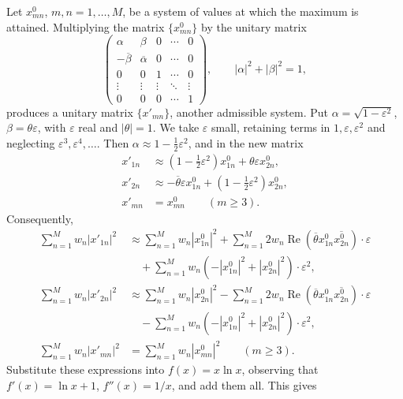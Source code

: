 \documentclass[fontsize=13pt,twoside,openany,headings=normal,parskip=false,bookmarkpackage=false,DIV=calc]{scrbook}
\begin{document}
Let $x^0_{mn}$, $m,n=1,\ldots,M$, be a system of values at which the maximum is attained. Multiplying the matrix $\{x^0_{mn}\}$ by the unitary matrix
\[
\begin{pmatrix}
\alpha&\beta&0&\cdots&0\\
-\overline\beta&\overline\alpha&0&\cdots&0\\
0&0&1&\cdots&0\\
\vdots&\vdots&\vdots&\ddots&\vdots\\
0&0&0&\cdots&1
\end{pmatrix},\qquad |\alpha|^2+|\beta|^2=1,
\]
produces a unitary matrix $\{x'_{mn}\}$, another admissible system. Put $\alpha=\sqrt{1-\varepsilon^2}$, $\beta=\theta\varepsilon$, with $\varepsilon$ real and $|\theta|=1$. We take $\varepsilon$ small, retaining terms in $1,\varepsilon,\varepsilon^2$ and neglecting $\varepsilon^3,\varepsilon^4,\ldots$. Then $\alpha\approx1-\tfrac12\varepsilon^2$, and in the new matrix
\begin{align*}
 x'_{1n}&\approx(1-\tfrac12\varepsilon^2)x^0_{1n}+\theta\varepsilon x^0_{2n},\\
 x'_{2n}&\approx-\overline\theta\varepsilon x^0_{1n}+(1-\tfrac12\varepsilon^2)x^0_{2n},\\
 x'_{mn}&=x^0_{mn}\qquad(m\geq3).
\end{align*}
\hypertarget{origpage-204}{}%
Consequently,
\begin{align*}
\sum_{n=1}^Mw_n|x'_{1n}|^2
&\approx\sum_{n=1}^Mw_n|x^0_{1n}|^2
+\sum_{n=1}^M2w_n\operatorname{Re}(\overline\theta x^0_{1n}\overline{x^0_{2n}})\cdot\varepsilon\\
&\quad+\sum_{n=1}^Mw_n(-|x^0_{1n}|^2+|x^0_{2n}|^2)\cdot\varepsilon^2,\\
\sum_{n=1}^Mw_n|x'_{2n}|^2
&\approx\sum_{n=1}^Mw_n|x^0_{2n}|^2
-\sum_{n=1}^M2w_n\operatorname{Re}(\overline\theta x^0_{1n}\overline{x^0_{2n}})\cdot\varepsilon\\
&\quad-\sum_{n=1}^Mw_n(-|x^0_{1n}|^2+|x^0_{2n}|^2)\cdot\varepsilon^2,\\
\sum_{n=1}^Mw_n|x'_{mn}|^2&=\sum_{n=1}^Mw_n|x^0_{mn}|^2\qquad(m\geq3).
\end{align*}
Substitute these expressions into $f(x)=x\ln x$, observing that $f'(x)=\ln x+1$, $f''(x)=1/x$, and add them all. This gives
\end{document}
